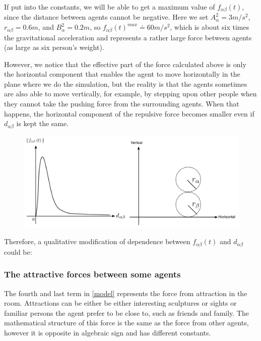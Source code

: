 If put into the constants, we will be able to get a maximum value of $ f_{\alpha\beta}(t) $, 
since the distance between agents cannot be negative. Here we set $ A_{\alpha}^{2} = 3 m/s^{2} $, 
$ r_{\alpha\beta} = 0.6 m $, and $ B_{\alpha}^{2} = 0.2 m $, so 
$ f_{\alpha\beta}(t)^{max} \doteq 60 m/s^{2} $, which is about six times the gravitational 
acceleration and represents a rather large force between agents (as large as six person's weight).

However, we notice that the effective part of the force calculated above is only the horizontal 
component that enables the agent to move horizontally in the plane where we do the simulation, 
but the reality is that the agents sometimes are also able to move vertically, for example, 
by stepping upon other people when they cannot take the pushing force from the surrounding agents. 
When that happens, the horizontal component of the repulsive force becomes smaller even if $ d_{\alpha\beta} $ 
is kept the same.	

\begin{figure}[ht]   
\centering
    {\includegraphics[scale=0.35]{Figures/ForceOverlapping.pdf}} 
    \caption{}
    \label{forceoverlapping}
\end{figure}

Therefore, a qualitative modification of dependence between $ f_{\alpha\beta}(t) $ and $ d_{\alpha\beta} $ could be:


\subsubsection{The attractive forces between some agents}
The fourth and last term in \eqref{model} represents the force from attraction 
in the room. Attractions can be either be either interesting sculptures or 
sights or familiar persons the agent prefer to be close to, such as friends 
and family. The mathematical structure of this force is the same as the force 
from other agents, however it is opposite in algebraic sign and has different 
constants. 

